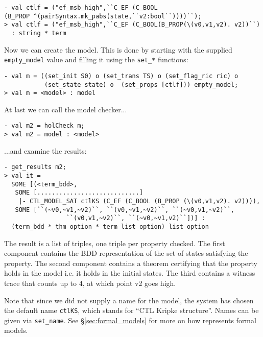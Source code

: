 \begin{session}\begin{verbatim}
- val ctlf = ("ef_msb_high",``C_EF (C_BOOL
(B_PROP ^(pairSyntax.mk_pabs(state,``v2:bool``))))``);
> val ctlf = ("ef_msb_high",``C_EF (C_BOOL(B_PROP(\(v0,v1,v2). v2))``)
  : string * term
\end{verbatim}\end{session}
Now we can create the model. This is done by starting with the supplied \texttt{empty\_model} value and filling it using the \texttt{set\_*} functions:
\begin{session}\begin{verbatim}
- val m = ((set_init S0) o (set_trans TS) o (set_flag_ric ric) o
           (set_state state) o  (set_props [ctlf])) empty_model;
> val m = <model> : model
\end{verbatim}\end{session}
At last we can call the model checker...
\begin{session}\begin{verbatim}
- val m2 = holCheck m;
> val m2 = model : <model>
\end{verbatim}\end{session}
...and examine the results:
\begin{session}\begin{verbatim}
- get_results m2;
> val it =
  SOME [(<term_bdd>,
   SOME [............................]
    |- CTL_MODEL_SAT ctlKS (C_EF (C_BOOL (B_PROP (\(v0,v1,v2). v2)))),
   SOME [``(~v0,~v1,~v2)``, ``(v0,~v1,~v2)``, ``(~v0,v1,~v2)``,
                 ``(v0,v1,~v2)``, ``(~v0,~v1,v2)``])] :
  (term_bdd * thm option * term list option) list option
\end{verbatim}\end{session}
The result is a list of triples, one triple per property checked. The first component contains the BDD representation of the set of states satisfying the property. The second component contains a theorem certifying that the property holds in the model i.e. it holds in the initial states. The third contains a witness trace that counts up to 4, at which point v2 goes high.

Note that since we did not supply a name for the model, the system has chosen the default name \texttt{ctlKS}, which stands for ``CTL Kripke structure''. Names can be given via \texttt{set\_name}. See \S\ref{sec:formal_models} for more on how \hc{} represents formal models.


